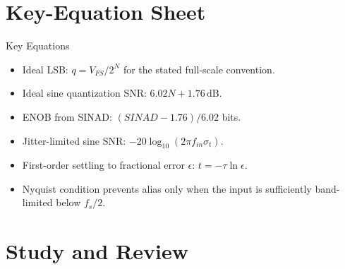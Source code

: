 \documentclass[10pt,letterpaper]{article}
\begin{document}
\section{Key-Equation Sheet}
\begin{CornellExamBox}{Key Equations}
\begin{itemize}
  \item Ideal LSB: $q=V_{FS}/2^N$ for the stated full-scale convention.
  \item Ideal sine quantization SNR: $6.02N+1.76\,\mathrm{dB}$.
  \item ENOB from SINAD: $(SINAD-1.76)/6.02$ bits.
  \item Jitter-limited sine SNR: $-20\log_{10}(2\pi f_{in}\sigma_t)$.
  \item First-order settling to fractional error $\epsilon$: $t=-\tau\ln\epsilon$.
  \item Nyquist condition prevents alias only when the input is sufficiently band-limited below $f_s/2$.
\end{itemize}\end{CornellExamBox}
\section{Study and Review}
\end{document}
